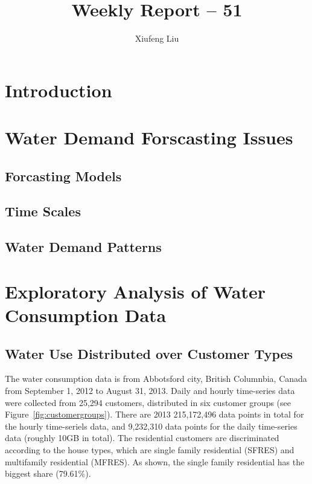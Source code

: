 \documentclass[a4paper,12pt]{llncs}
\begin{document}
\title{Weekly Report -- 51}
\author{Xiufeng Liu}
\maketitle
\section{Introduction}

\section{Water Demand Forscasting Issues}

\subsection{Forcasting Models}

\subsection{Time Scales}

\subsection{Water Demand Patterns}

\section{Exploratory Analysis of Water Consumption Data}
\subsection{Water Use Distributed over  Customer Types}
The water consumption data is from  Abbotsford  city, British Columnbia, Canada from September 1, 2012 to August 31, 2013. Daily and hourly time-series data were collected from 25,294 customers,  distributed in six customer groups (see Figure~\ref{fig:customergroups}). There are 2013 215,172,496 data points in total for the hourly time-seriels data, and 9,232,310 data points for the daily time-series data (roughly 10GB in total). The residential customers are discriminated according to the house types, which are single family residential (SFRES) and multifamily residential (MFRES). As shown, the single family residential has the biggest share (79.61\%).
\end{document}
